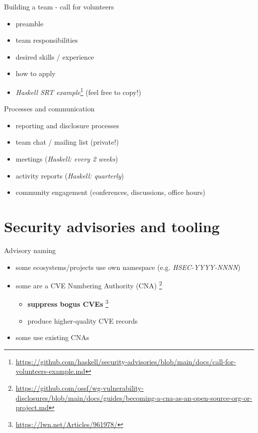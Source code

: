 \documentclass[ignorenonframetext,aspectratio=169,12pt]{beamer}
\begin{document}
\begin{frame}{Building a team - call for volunteers}
  \begin{itemize}
    \item preamble
    \item team responsibilities
    \item desired skills / experience
    \item how to apply
    \item {\em Haskell SRT example}\footnote{\url{https://github.com/haskell/security-advisories/blob/main/docs/call-for-volunteers-example.md}} (feel free to copy!)
  \end{itemize}
\end{frame}

\begin{frame}{Processes and communication}
    \begin{itemize}
        \item reporting and disclosure processes
        \item team chat / mailing list (private!)
        \item meetings ({\em Haskell: every 2 weeks})
        \item activity reports ({\em Haskell: quarterly})
        \item community engagement (conferences, discussions, office hours)
    \end{itemize}
\end{frame}


\section{Security advisories and tooling}

\begin{frame}{Advisory naming}
  \begin{itemize}
    \item some ecosystems/projects use own namespace
      (e.g. {\em HSEC-YYYY-NNNN})
    \item some are a CVE Numbering Authority (CNA)
        \footnote{\url{https://github.com/ossf/wg-vulnerability-disclosures/blob/main/docs/guides/becoming-a-cna-as-an-open-source-org-or-project.md}}
      \begin{itemize}
        \item {\bf suppress bogus CVEs}
          \footnote{\url{https://lwn.net/Articles/961978/}}
        \item produce higher-quality CVE records
      \end{itemize}
    \item some use existing CNAs
  \end{itemize}
\end{frame}
\end{document}
